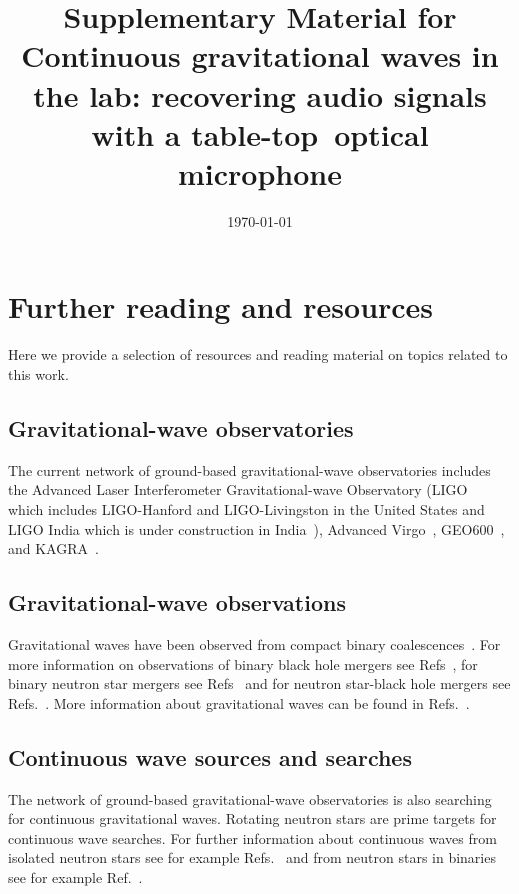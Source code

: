 \documentclass[aps,pra,superscriptaddress,reprint]{revtex4-2}
\begin{document}
\title{Supplementary Material for \texorpdfstring{\\}{}Continuous gravitational waves in the lab: recovering audio signals with a table-top~optical microphone} 



\date{\today}

\maketitle

\section{Further reading and resources}

Here we provide a selection of resources and reading material on topics related to this work. 

\subsection{Gravitational-wave observatories}
The current network of ground-based gravitational-wave observatories includes the Advanced Laser Interferometer Gravitational-wave Observatory (LIGO~\cite{AdvancedLIGO:2015} which includes LIGO-Hanford and LIGO-Livingston in the United States and LIGO India which is under construction in India~\cite{LIGOIndia:2021}), Advanced Virgo~\cite{AdvancedVirgo:2015}, GEO600~\cite{GEO600:2010}, and KAGRA~\cite{KAGRA:2013}. 

\subsection{Gravitational-wave observations}
Gravitational waves have been observed from compact binary coalescences~\cite{GW150914}. 
For more information on observations of binary black hole mergers see Refs~\cite{GW150914,GW151226,GW170104,GW170814,GW190521,GWTC-1:2018,GWTC-2:2020,GWTC-1:2018}, for binary neutron star mergers see Refs~\cite{GW170817,GW170817multi,GW190425,GWTC-1:2018,GWTC-2:2020} and for neutron star-black hole mergers see Refs.~\cite{NSBH:2021,GW190814}.
More information about gravitational waves can be found in Refs.~\cite{Maggiore:2007,CBCs:2014,ObsScenarioDoc:2020,Einstein:1916}.

\subsection{Continuous wave sources and searches}
\label{sec:GWSsearches}
The network of ground-based gravitational-wave observatories is also searching for continuous gravitational waves. 
Rotating neutron stars are prime targets for continuous wave searches. 
For further information about continuous waves from isolated neutron stars see for example Refs.~\cite{MelatosDouglassSimula:2015,Jones:2010} and from neutron stars in binaries see for example Ref.~\cite{BildstenTB:1998}.
\end{document}
